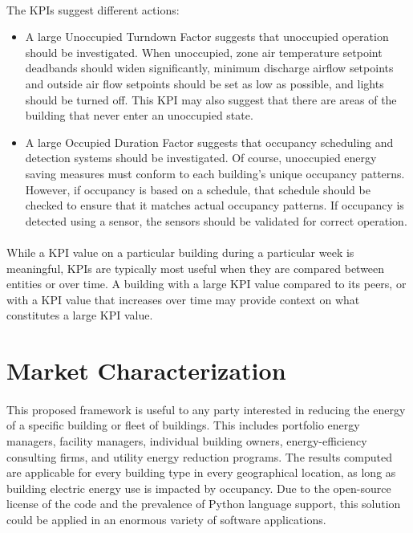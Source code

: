 \documentclass[a4paper]{article}
\begin{document}
\paragraph{}
The KPIs suggest different actions:
\begin{itemize}
\item{A large Unoccupied Turndown Factor suggests that unoccupied operation should be investigated. When unoccupied, zone air temperature setpoint deadbands should widen significantly, minimum discharge airflow setpoints and outside air flow setpoints should be set as low as possible, and lights should be turned off. This KPI may also suggest that there are areas of the building that never enter an unoccupied state.}
\item{A large Occupied Duration Factor suggests that occupancy scheduling and detection systems should be investigated. Of course, unoccupied energy saving measures must conform to each building's unique occupancy patterns. However, if occupancy is based on a schedule, that schedule should be checked to ensure that it matches actual occupancy patterns. If occupancy is detected using a sensor, the sensors should be validated for correct operation.}
\end{itemize}

\paragraph{}
While a KPI value on a particular building during a particular week is meaningful, KPIs are typically most useful when they are compared between entities or over time. A building with a large KPI value compared to its peers, or with a KPI value that increases over time may provide context on what constitutes a large KPI value.

\section{Market Characterization}

\paragraph{}
This proposed framework is useful to any party interested in reducing the energy of a specific building or fleet of buildings. This includes portfolio energy managers, facility managers, individual building owners, energy-efficiency consulting firms, and utility energy reduction programs. The results computed are applicable for every building type in every geographical location, as long as building electric energy use is impacted by occupancy. Due to the open-source license of the code and the prevalence of Python language support, this solution could be applied in an enormous variety of software applications.
\end{document}

